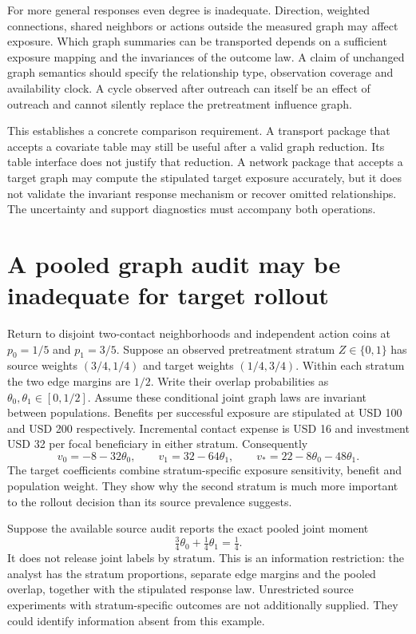 For more general responses even degree is inadequate. Direction, weighted
connections, shared neighbors or actions outside the measured graph may affect
exposure. Which graph summaries can be transported depends on a sufficient
exposure mapping and the invariances of the outcome law. A claim of unchanged
graph semantics should specify the relationship type, observation coverage and
availability clock. A cycle observed after outreach can itself be an effect of
outreach and cannot silently replace the pretreatment influence graph.

This establishes a concrete comparison requirement. A transport package that
accepts a covariate table may still be useful after a valid graph reduction.
Its table interface does not justify that reduction. A network package that
accepts a target graph may compute the stipulated target exposure accurately,
but it does not validate the invariant response mechanism or recover omitted
relationships. The uncertainty and support diagnostics must accompany both
operations.

\section{A pooled graph audit may be inadequate for target rollout}
\label{exec17:s7-pooled}

Return to disjoint two-contact neighborhoods and independent action coins at
$p_0=1/5$ and $p_1=3/5$. Suppose an observed pretreatment stratum $Z\in\{0,1\}$
has source weights $(3/4,1/4)$ and target weights $(1/4,3/4)$. Within each
stratum the two edge margins are $1/2$. Write their overlap probabilities
as $\theta_0,\theta_1\in[0,1/2]$. Assume these conditional joint graph laws
are invariant between populations. Benefits per successful exposure are
stipulated at USD 100 and USD 200 respectively. Incremental contact expense
is USD 16 and investment USD 32 per focal beneficiary in either stratum.
Consequently
\begin{equation}
 v_0=-8-32\theta_0,\qquad v_1=32-64\theta_1,
 \qquad v_*=22-8\theta_0-48\theta_1.
 \label{exec17:s7-stratum-values}
\end{equation}
The target coefficients combine stratum-specific exposure sensitivity,
benefit and population weight. They show why the second stratum is much more
important to the rollout decision than its source prevalence suggests.

Suppose the available source audit reports the exact pooled joint moment
\begin{equation}
 \tfrac34\theta_0+\tfrac14\theta_1=\tfrac14.
 \label{exec17:s7-pooled-constraint}
\end{equation}
It does not release joint labels by stratum. This is an information restriction:
the analyst has the stratum proportions, separate edge margins and the pooled
overlap, together with the stipulated response law. Unrestricted source
experiments with stratum-specific outcomes are not additionally supplied.
They could identify information absent from this example.

